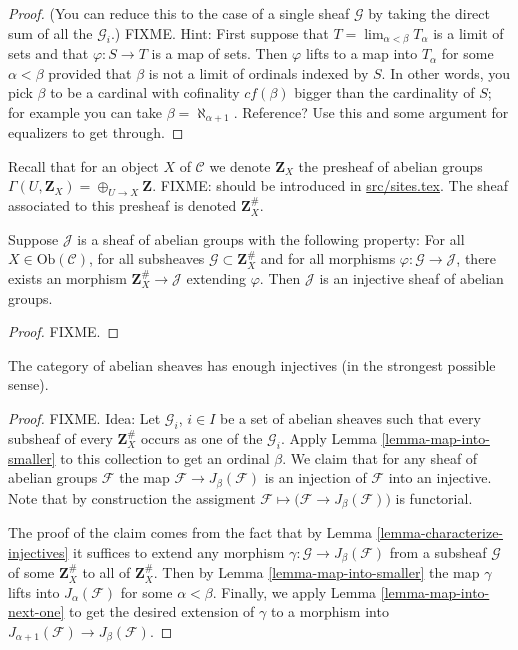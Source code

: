 \begin{proof}
(You can reduce this to the case of a single sheaf $\mathcal{G}$
by taking the direct sum of all the $\mathcal{G}_i$.)
FIXME. Hint: First suppose that $T = \lim_{\alpha < \beta} T_\alpha$
is a limit of sets and that $\varphi : S \to T$ is a map of sets. 
Then $\varphi$ lifts to a map into $T_\alpha$ for some $\alpha < \beta$
provided that $\beta$ is not a limit of ordinals indexed by $S$.
In other words, you pick $\beta$ to be a cardinal with cofinality
$cf(\beta)$ bigger than the cardinality of $S$; for example you can take 
$\beta = \aleph_{\alpha+1}$. Reference? Use this and
some argument for equalizers to get through.
\end{proof}

\noindent
Recall that for an object $X$ of $\mathcal{C}$ we denote $\mathbf{Z}_X$ 
the presheaf of abelian groups $\Gamma(U, \mathbf{Z}_X) = 
\oplus_{U \to X} \mathbf{Z}$. FIXME: should be introduced in
\url{src/sites.tex}. The sheaf associated to this presheaf
is denoted $\mathbf{Z}_X^\#$.

\begin{lemma}
\label{lemma-characterize-injectives}
Suppose $\mathcal{J}$ is a sheaf of abelian groups with the following
property: For all $X\in \text{Ob}(\mathcal{C})$, for all subsheaves
$\mathcal{G} \subset \mathbf{Z}_X^\#$ and for all morphisms
$\varphi : \mathcal{G} \to \mathcal{J}$, there exists an morphism
$\mathbf{Z}_X^\# \to \mathcal{J}$ extending $\varphi$.
Then $\mathcal{J}$ is an injective sheaf of abelian groups.
\end{lemma}

\begin{proof}
FIXME.
\end{proof}

\begin{theorem}
\label{theorem-sheaves-injectives}
The category of abelian sheaves has enough injectives (in the
strongest possible sense).
\end{theorem}

\begin{proof}
FIXME. Idea: Let $\mathcal{G}_i$, $i\in I$ be a set of abelian
sheaves such that every subsheaf of every $\mathbf{Z}_X^\#$
occurs as one of the $\mathcal{G}_i$. Apply
Lemma \ref{lemma-map-into-smaller} to this collection to
get an ordinal $\beta$. We claim that for any sheaf of abelian
groups $\mathcal{F}$ the map $\mathcal{F} \to J_\beta(\mathcal{F})$
is an injection of $\mathcal{F}$ into an injective.
Note that by construction the assigment $\mathcal{F} \mapsto
\big(\mathcal{F} \to J_\beta(\mathcal{F})\big)$ is functorial.

\smallskip\noindent
The proof of the claim comes from the fact that by
Lemma \ref{lemma-characterize-injectives} it suffices to extend any
morphism $\gamma : \mathcal{G} \to J_\beta(\mathcal{F})$ 
from a subsheaf $\mathcal{G}$ of some $\mathbf{Z}_X^\#$ to all of
$\mathbf{Z}_X^\#$. Then by Lemma \ref{lemma-map-into-smaller} the
map $\gamma$ lifts into $J_\alpha(\mathcal{F})$ for some
$\alpha < \beta$. Finally, we apply Lemma \ref{lemma-map-into-next-one}
to get the desired extension of $\gamma$ to a morphism
into $J_{\alpha+1}(\mathcal{F}) \to J_\beta(\mathcal{F})$.
\end{proof}

